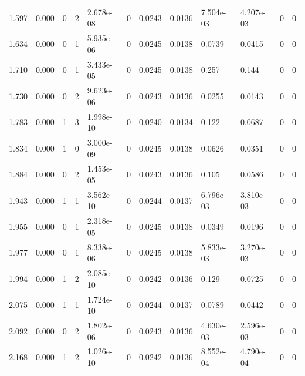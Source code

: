\documentclass[preview]{standalone}
\begin{document}
{{\begin{tabular}{L{1.2cm}C{1.2cm} C{0.3cm}C{0.5cm} C{1.4cm}C{1.4cm} C{1.4cm}C{1.4cm} C{1.6cm}C{1.6cm} C{1.6cm}C{1.6cm}}
  1.597  &  0.000  & 0     &  2 &  2.678e-08  & 0  &  0.0243&   0.0136& 7.504e-03 & 4.207e-03   &  0 & 0  \\ 
  1.634  &  0.000  & 0     &  1 &  5.935e-06  & 0  &  0.0245&   0.0138& 0.0739 & 0.0415   &  0 & 0  \\ 
  1.710  &  0.000  & 0     &  1 &  3.433e-05  & 0  &  0.0245&   0.0138& 0.257 & 0.144   &  0 & 0  \\ 
  1.730  &  0.000  & 0     &  2 &  9.623e-06  & 0  &  0.0243&   0.0136& 0.0255 & 0.0143   &  0 & 0  \\ 
  1.783  &  0.000  & 1     &  3 &  1.998e-10  & 0  &  0.0240&   0.0134& 0.122 & 0.0687   &  0 & 0  \\ 
  1.834  &  0.000  & 1     &  0 &  3.000e-09  & 0  &  0.0245&   0.0138& 0.0626 & 0.0351   &  0 & 0  \\ 
  1.884  &  0.000  & 0     &  2 &  1.453e-05  & 0  &  0.0243&   0.0136& 0.105 & 0.0586   &  0 & 0  \\ 
  1.943  &  0.000  & 1     &  1 &  3.562e-10  & 0  &  0.0244&   0.0137& 6.796e-03 & 3.810e-03   &  0 & 0  \\ 
  1.955  &  0.000  & 0     &  1 &  2.318e-05  & 0  &  0.0245&   0.0138& 0.0349 & 0.0196   &  0 & 0  \\ 
  1.977  &  0.000  & 0     &  1 &  8.338e-06  & 0  &  0.0245&   0.0138& 5.833e-03 & 3.270e-03   &  0 & 0  \\ 
  1.994  &  0.000  & 1     &  2 &  2.085e-10  & 0  &  0.0242&   0.0136& 0.129 & 0.0725   &  0 & 0  \\ 
  2.075  &  0.000  & 1     &  1 &  1.724e-10  & 0  &  0.0244&   0.0137& 0.0789 & 0.0442   &  0 & 0  \\ 
  2.092  &  0.000  & 0     &  2 &  1.802e-06  & 0  &  0.0243&   0.0136& 4.630e-03 & 2.596e-03   &  0 & 0  \\ 
  2.168  &  0.000  & 1     &  2 &  1.026e-10  & 0  &  0.0242&   0.0136& 8.552e-04 & 4.790e-04   &  0 & 0  \\ 
\hline 
\end{tabular} 

}}
\end{document}
